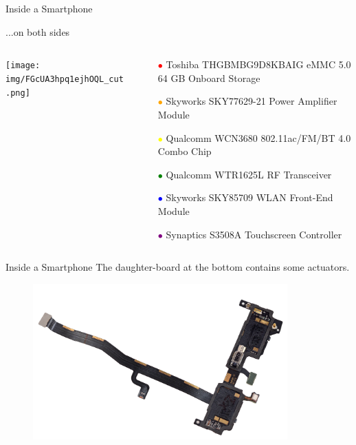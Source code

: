\documentclass[aspectratio=169]{beamer}
\begin{document}
	\begin{frame}{Inside a Smartphone}
		\begin{flushleft}...on both sides\end{flushleft}
		\begin{columns}
		\begin{column}{0.55\textwidth}	
		\centering
		\texttt{[image: img/FGcUA3hpq1ejhOQL\_cut.png]}	
		\end{column}
		\begin{column}{0.45\textwidth}
		\centering		
		\begin{footnotesize}
		\begin{itemize}
		\item[\textcolor{red}{$\bullet$}] Toshiba THGBMBG9D8KBAIG eMMC 5.0 64 GB Onboard Storage
		\item[\textcolor{orange}{$\bullet$}] Skyworks SKY77629-21 Power Amplifier Module
		\item[\textcolor{yellow}{$\bullet$}] Qualcomm WCN3680 802.11ac/FM/BT 4.0 Combo Chip
		\item[\textcolor{green}{$\bullet$}] Qualcomm WTR1625L RF Transceiver
		\item[\textcolor{blue}{$\bullet$}] Skyworks SKY85709 WLAN Front-End Module
		\item[\textcolor{purple}{$\bullet$}] Synaptics S3508A Touchscreen Controller
		\end{itemize}
		\end{footnotesize}
		\end{column}
		\end{columns}
	\end{frame}  



	\begin{frame}{Inside a Smartphone}
		The daughter-board at the bottom contains some actuators.
		\begin{figure}[b]
		\centering
		\includegraphics[width=\textwidth,height=6cm,keepaspectratio]{img/wdnGHA1UB3lBpZIL.png}
		\end{figure}
	\end{frame}    
\end{document}
